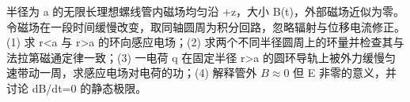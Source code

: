 半径为 a 的无限长理想螺线管内磁场均匀沿 +z，大小 B(t)，外部磁场近似为零。令磁场在一段时间缓慢改变，取同轴圆周为积分回路，忽略辐射与位移电流修正。
(1) 求 r<a 与 r>a 的环向感应电场；(2) 求两个不同半径圆周上的环量并检查其与法拉第磁通定律一致；(3) 一电荷 q 在固定半径 r>a 的圆环导轨上被外力缓慢匀速带动一周，求感应电场对电荷的功；(4) 解释管外 \(B\approx 0\) 但 E 非零的意义，并讨论 dB/dt=0 的静态极限。

